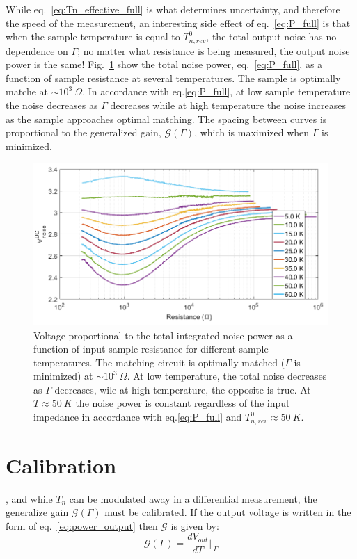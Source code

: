 While eq.~\ref{eq:Tn_effective_full} is what determines uncertainty, and therefore the speed of the measurement, an interesting side effect of eq.~\ref{eq:P_full} is that when the sample temperature is equal to $T_{n,rev}^0$, the total output noise has no dependence on $\Gamma$; no matter what resistance is being measured, the output noise power is the same! Fig.~\ref{fig:JNT_Vn_vs_R} show the total noise power, eq.~\ref{eq:P_full}, as a function of sample resistance at several temperatures. The sample is optimally matche at ${\sim}10^3~\Omega$. In accordance with eq.\ref{eq:P_full}, at low sample temperature the noise decreases as $\Gamma$ decreases while at high temperature the noise increases as the sample approaches optimal matching. The spacing between curves is proportional to the generalized gain, $\mathcal{G}(\Gamma)$, which is maximized when $\Gamma$ is minimized.
\begin{figure}
\centering
\includegraphics[width=120mm]{figures/Johnson_noise_thermometry/Vn_vs_R.png}
\caption{Voltage proportional to the total integrated noise power as a function of input sample resistance for different sample temperatures. The matching circuit is optimally matched ($\Gamma$ is minimized) at ${\sim}10^3~\Omega$. At low temperature, the total noise decreases as $\Gamma$ decreases, wile at high temperature, the opposite is true. At $T\approx50~K$ the noise power is constant regardless of the input impedance in accordance with eq.\ref{eq:P_full} and $T_{n,rev}^0\approx50~K$.}
\label{fig:JNT_Vn_vs_R}
\end{figure}

\section{Calibration}
, and while $T_n$ can be modulated away in a differential measurement, the generalize gain $\mathcal{G}(\Gamma)$ must be calibrated. If the output voltage is written in the form of eq.~\ref{eq:power_output} then $\mathcal{G}$ is given by:
\begin{equation}
\mathcal{G}(\Gamma) = \frac{dV_{out}}{dT}\bigg\rvert_{~\Gamma}
\end{equation}

